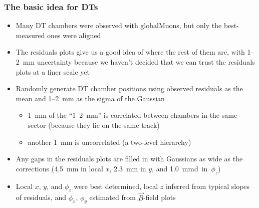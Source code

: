 \documentclass[compress]{beamer}
\begin{document}
\begin{frame}
\frametitle{The basic idea for DTs}
\begin{itemize}
\item Many DT chambers were observed with globalMuons, but only the
  best-measured ones were aligned
\item The residuals plots give us a good idea of where the rest of
  them are, with 1--2~mm uncertainty because we haven't decided that
  we can trust the residuals plots at a finer scale yet
\item Randomly generate DT chamber positions using observed residuals
  as the mean and 1--2~mm as the sigma of the Gaussian
\begin{itemize}
\item 1~mm of the ``1--2~mm'' is correlated between chambers in the
  same sector (because they lie on the same track)
\item another 1~mm is uncorrelated (a two-level hierarchy)
\end{itemize}
\item Any gaps in the residuals plots are filled in with Gaussians as
  wide as the corrections (4.5~mm in local $x$, 2.3~mm in $y$, and
  \mbox{1.0~mrad in $\phi_z$)\hspace{-1 cm}}
\item Local $x$, $y$, and $\phi_z$ were best determined, local $z$
  inferred from typical slopes of residuals, and $\phi_x$, $\phi_y$
  estimated from $\vec{B}$-field plots
\end{itemize}
\end{frame}
\end{document}

